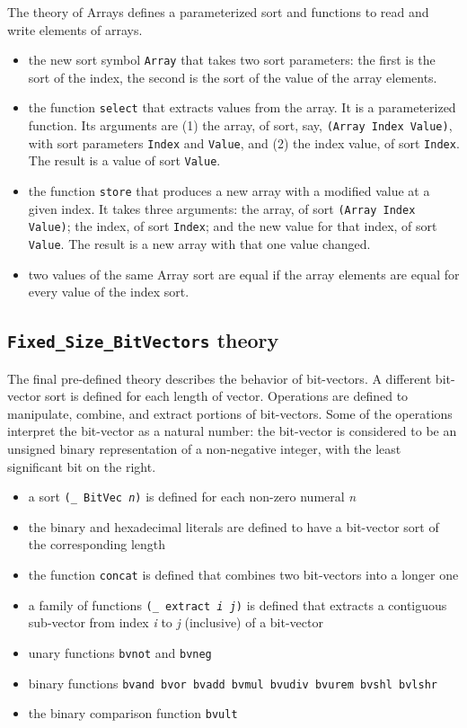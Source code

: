 \documentclass[12pt,oneside]{report}
\begin{document}
 
 The theory of Arrays defines a parameterized sort and functions to read and write elements of arrays.
 \begin{itemize}
 \item the new sort symbol {\tt Array} that takes two sort parameters: the first is the sort of the index, the second is the sort of the
 value of the array elements.
 \item the function {\tt select} that extracts values from the array. It is a parameterized function. Its arguments are (1) the array, of sort, say, {\tt (Array Index Value)}, with sort parameters {\tt Index} and {\tt Value}, and (2) the index value, of sort {\tt Index}. The result is a value of sort {\tt Value}.
 \item the function {\tt store} that produces a new array with a modified value at a given index.  It takes three arguments: the array, of sort 
 {\tt (Array Index Value)}; the index, of sort {\tt Index}; and the new value for that index, of sort {\tt Value}. The result is a new array
 with that one value changed.
 \item two values of the same Array sort are equal if the array elements are equal for every value of the index sort.
 \end{itemize}
 
 \subsection{{\tt Fixed\_Size\_BitVectors} theory}
 
 The final pre-defined theory describes the behavior of bit-vectors. A different bit-vector sort is defined for each length of vector.
 Operations are defined to manipulate, combine, and extract portions of bit-vectors. Some of the operations interpret the bit-vector
 as a natural number: the bit-vector is considered to be an unsigned binary representation of a non-negative integer, with the least significant
 bit on the right.
 \begin{itemize}
 \item a sort {\tt (\_ BitVec {\it n})} is defined for each non-zero numeral {\it n}
 \item the binary and hexadecimal literals are defined to have a bit-vector sort of the corresponding length
 \item the function {\tt concat} is defined that combines two bit-vectors into a longer one
 \item a family of functions {\tt (\_ extract {\it i j})} is defined that extracts a contiguous sub-vector from index {\it i} to {\it j} (inclusive) of a bit-vector
 \item unary functions {\tt bvnot} and {\tt bvneg}
 \item binary functions {\tt bvand bvor bvadd bvmul bvudiv bvurem bvshl bvlshr}
 \item the binary comparison function {\tt bvult} 
 \end{itemize}
 
\end{document}
